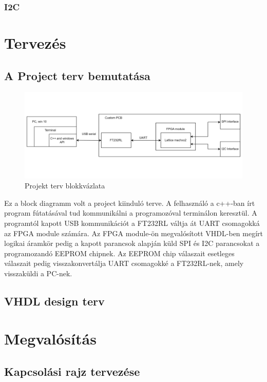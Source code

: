 \documentclass[a4paper,12pt,oneside]{book}
\begin{document}
\subsection{I2C}
\chapter{Tervezés}
\section{A Project terv bemutatása}

\begin{figure}[H]
	\centering
	\includegraphics[trim=1mm 1mm 1mm 1mm,scale=0.245]{terv1.png}
	\caption{Projekt terv blokkvázlata}
	\label{Projekt terv}
\end{figure}
Ez a block diagramm volt a project kiinduló terve. A felhasználó a c++-ban írt program fútatásával tud kommunikálni a programozóval terminálon keresztül. A programtól kapott  USB kommunikációt a FT232RL váltja át UART csomagokká az FPGA module számára. Az FPGA module-ön megvalósított VHDL-ben megírt logikai áramkör pedig a kapott parancsok alapján küld SPI és I2C parancsokat a programozandó EEPROM chipnek. Az EEPROM chip válaszait esetleges válaszait pedig visszakonvertálja UART csomagokké a FT232RL-nek, amely visszaküldi a PC-nek.
\section{VHDL design terv}
\chapter{Megvalósítás}

\section{Kapcsolási rajz tervezése}
\end{document}
